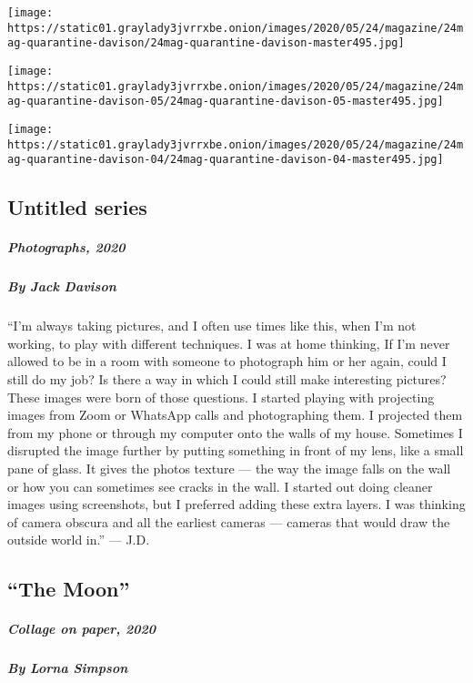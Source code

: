 \texttt{[image: https://static01.graylady3jvrrxbe.onion/images/2020/05/24/magazine/24mag-quarantine-davison/24mag-quarantine-davison-master495.jpg]}

\texttt{[image: https://static01.graylady3jvrrxbe.onion/images/2020/05/24/magazine/24mag-quarantine-davison-05/24mag-quarantine-davison-05-master495.jpg]}

\texttt{[image: https://static01.graylady3jvrrxbe.onion/images/2020/05/24/magazine/24mag-quarantine-davison-04/24mag-quarantine-davison-04-master495.jpg]}

\hypertarget{untitled-series-1}{%
\subsection{Untitled series}\label{untitled-series-1}}

\hypertarget{photographs-2020-1}{%
\subparagraph{Photographs, 2020}\label{photographs-2020-1}}

\hypertarget{by-jack-davison-1}{%
\subparagraph{By Jack Davison}\label{by-jack-davison-1}}

``I'm always taking pictures, and I often use times like this, when I'm
not working, to play with different techniques. I was at home thinking,
If I'm never allowed to be in a room with someone to photograph him or
her again, could I still do my job? Is there a way in which I could
still make interesting pictures? These images were born of those
questions. I started playing with projecting images from Zoom or
WhatsApp calls and photographing them. I projected them from my phone or
through my computer onto the walls of my house. Sometimes I disrupted
the image further by putting something in front of my lens, like a small
pane of glass. It gives the photos texture --- the way the image falls
on the wall or how you can sometimes see cracks in the wall. I started
out doing cleaner images using screenshots, but I preferred adding these
extra layers. I was thinking of camera obscura and all the earliest
cameras --- cameras that would draw the outside world in.'' --- J.D.

\hypertarget{the-moon}{%
\subsection{``The Moon''}\label{the-moon}}

\hypertarget{collage-on-paper-2020}{%
\subparagraph{Collage on paper, 2020}\label{collage-on-paper-2020}}

\hypertarget{by-lorna-simpson}{%
\subparagraph{By Lorna Simpson}\label{by-lorna-simpson}}


